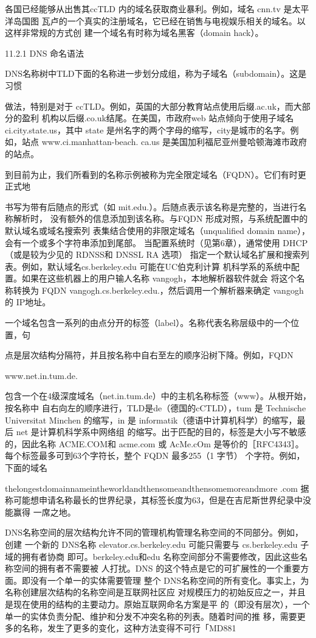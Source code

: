 各国已经能够从出售其ccTLD 内的域名获取商业暴利。例如，域名 cnn.tv 是太平洋岛国图
瓦卢的一个真实的注册域名，它已经在销售与电视娱乐相关的域名。以这样非常规的方式创
建一个域名有时称为域名黑客（domain hack）。

11.2.1 DNS 命名语法

DNS名称树中TLD下面的名称进一步划分成组，称为子域名（subdomain）。这是习惯

做法，特别是对于 ccTLD。例如，英国的大部分教育站点使用后缀.ac.uk，而大部分的盈利
机构以后缀.co.uk结尾。在美国，市政府web 站点倾向于使用子域名 ci.city.state.us，其中
state 是州名字的两个字母的缩写，city是城市的名字。例如，站点 www.ci.manhattan-beach.
ca.us 是美国加利福尼亚州曼哈顿海滩市政府的站点。

到目前为止，我们所看到的名称示例被称为完全限定域名（FQDN）。它们有时更正式地

书写为带有后随点的形式（如 mit.edu.）。后随点表示该名称是完整的，当进行名称解析时，
没有额外的信息添加到该名称。与FQDN 形成对照，与系统配置中的默认域名或域名搜索列
表集结合使用的非限定域名（unqualified domain name），会有一个或多个字符串添加到尾部。
当配置系统时（见第6章），通常使用 DHCP（或是较为少见的 RDNSS和 DNSSL RA 选项）
指定一个默认域名扩展和搜索列表。例如，默认域名cs.berkeley.edu 可能在UC伯克利计算
机科学系的系统中配置。如果在这些机器上的用户输人名称 vangogh，本地解析器软件就会
将这个名称转换为 FQDN vangogh.cs.berkeley.edu.，然后调用一个解析器来确定 vangogh 的
IP地址。

一个域名包含一系列的由点分开的标签（label）。名称代表名称层级中的一个位置，句

点是层次结构分隔符，并且按名称中自右至左的顺序沿树下降。例如，FQDN

www.net.in.tum.de.

包含一个在4级深度域名（net.in.tum.de）中的主机名称标签（www）。从根开始，按名称中
自右向左的顺序进行，TLD是de（德国的cCTLD），tum 是 Technische Universitat Minchen
的缩写，in 是 informatik（德语中计算机科学）的缩写，最后 net 是计算机科学系中网络组
的缩写。出于匹配的目的，标签是大小写不敏感的，因此名称 ACME.COM和 acme.com 或
AcMe.cOm 是等价的［RFC4343］。每个标签最多可到63个字符长，整个 FQDN 最多255（1
字节） 个字符。例如，下面的域名

thelongestdomainnameintheworldandthensomeandthensomemoreandmore .com
据称可能想申请名称最长的世界纪录，其标签长度为63，但是在吉尼斯世界纪录中没能赢得
一席之地。

DNS名称空间的层次结构允许不同的管理机构管理名称空间的不同部分。例如，创建
一个新的 DNS名称 elevator.cs.berkeley.edu 可能只需要与 cs.berkeley.edu 子域的拥有者协商
即可。berkeley.edu和edu 名称空间部分不需要修改，因此这些名称空间的拥有者不需要被
人打扰。DNS 的这个特点是它的可扩展性的一个重要方面。即没有一个单一的实体需要管理
整个 DNS名称空间的所有变化。事实上，为名称创建层次结构的名称空间是互联网社区应
对规模压力的初始反应之一，并且是现在使用的结构的主要动力。原始互联网命名方案是平
的（即没有层次），一个单一的实体负责分配、维护和分发不冲突名称的列表。随着时间的推
移，需要更多的名称，发生了更多的变化，这种方法变得不可行「MD881

